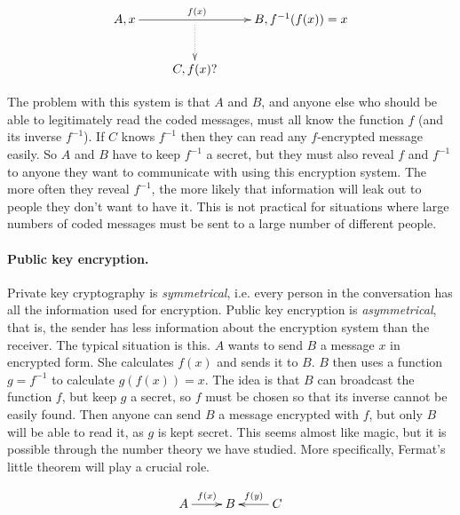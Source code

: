 \documentclass{article}
\theoremstyle{plain}
\begin{document}
\[\xymatrix{A,x\ar[rr]^{f(x)\hspace{.9cm}} &\ar@{..>}[d] & B,f^{-1}(f(x))=x\\
& C, f(x)?}\]

The problem with this system is that $A$ and $B$, and anyone else who should be able to legitimately read the coded messages, must all know the function $f$ (and its inverse $f^{-1}$). If $C$ knows $f^{-1}$ then they can read any $f$-encrypted message easily. So $A$ and $B$ have to keep $f^{-1}$ a secret, but they must also reveal $f$ and $f^{-1}$ to anyone they want to communicate with using this encryption system. The more often they reveal $f^{-1}$, the more likely that information will leak out to people they don't want to have it. This is not practical for situations where large numbers of coded messages must be sent to a large number of different people. 

\paragraph{Public key encryption.}
Private key cryptography is \emph{symmetrical}, i.e. every person in the conversation has all the information used for encryption. Public key encryption is \emph{asymmetrical}, that is, the sender has less information about the encryption system than the receiver. The typical situation is this. $A$ wants to send $B$ a message $x$ in encrypted form. She calculates $f(x)$ and sends it to $B$. $B$ then uses a function $g=f^{-1}$ to calculate $g(f(x))=x$. The idea is that $B$ can broadcast the function $f$, but keep $g$ a secret, so $f$ must be chosen so that its inverse cannot be easily found. Then anyone can send $B$ a message encrypted with $f$, but only $B$ will be able to read it, as $g$ is kept secret. This seems almost like magic, but it is possible through the number theory we have studied. More specifically, Fermat's little theorem will play a crucial role. 

\[\xymatrix{A\ar[r]^{f(x)} & B & C\ar[l]_{f(y)}}\]
\end{document}

